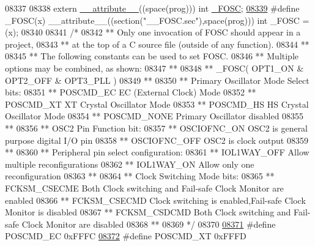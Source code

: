 \begin{DoxyCode}
{{{{08337 
08338 \textcolor{keyword}{extern} \hyperlink{a00009_a493c46f03454991ccc5aa7a6e1dfb2a7}{\_\_attribute\_\_}((space(prog))) int \hyperlink{a00009_a3b72a7757ab208ee35d0398426a4bca0}{\_FOSC};
\hypertarget{a00009_source_l08339}{}\hyperlink{a00009_a3b72a7757ab208ee35d0398426a4bca0}{08339} \textcolor{preprocessor}{#define \_FOSC(x) \_\_attribute\_\_((section("\_\_FOSC.sec"),space(prog))) int \_FOSC = (x);}
08340 
08341 \textcolor{comment}{/*}
08342 \textcolor{comment}{** Only one invocation of FOSC should appear in a project,}
08343 \textcolor{comment}{** at the top of a C source file (outside of any function).}
08344 \textcolor{comment}{**}
08345 \textcolor{comment}{** The following constants can be used to set FOSC.}
08346 \textcolor{comment}{** Multiple options may be combined, as shown:}
08347 \textcolor{comment}{**}
08348 \textcolor{comment}{** \_FOSC( OPT1\_ON & OPT2\_OFF & OPT3\_PLL )}
08349 \textcolor{comment}{**}
08350 \textcolor{comment}{**   Primary Oscillator Mode Select bits:}
08351 \textcolor{comment}{**     POSCMD\_EC            EC (External Clock) Mode}
08352 \textcolor{comment}{**     POSCMD\_XT            XT Crystal Oscillator Mode}
08353 \textcolor{comment}{**     POSCMD\_HS            HS Crystal Oscillator Mode}
08354 \textcolor{comment}{**     POSCMD\_NONE          Primary Oscillator disabled}
08355 \textcolor{comment}{**}
08356 \textcolor{comment}{**   OSC2 Pin Function bit:}
08357 \textcolor{comment}{**     OSCIOFNC\_ON          OSC2 is general purpose digital I/O pin}
08358 \textcolor{comment}{**     OSCIOFNC\_OFF         OSC2 is clock output}
08359 \textcolor{comment}{**}
08360 \textcolor{comment}{**   Peripheral pin select configuration:}
08361 \textcolor{comment}{**     IOL1WAY\_OFF          Allow multiple reconfigurations}
08362 \textcolor{comment}{**     IOL1WAY\_ON           Allow only one reconfiguration}
08363 \textcolor{comment}{**}
08364 \textcolor{comment}{**   Clock Switching Mode bits:}
08365 \textcolor{comment}{**     FCKSM\_CSECME         Both Clock switching and Fail-safe Clock Monitor are enabled}
08366 \textcolor{comment}{**     FCKSM\_CSECMD         Clock switching is enabled,Fail-safe Clock Monitor is disabled}
08367 \textcolor{comment}{**     FCKSM\_CSDCMD         Both Clock switching and Fail-safe Clock Monitor are disabled}
08368 \textcolor{comment}{**}
08369 \textcolor{comment}{*/}
08370 
\hypertarget{a00009_source_l08371}{}\hyperlink{a00009_a289cbd35334c9f85bd0b549a42a75b07}{08371} \textcolor{preprocessor}{#define POSCMD\_EC            0xFFFC}
\hypertarget{a00009_source_l08372}{}\hyperlink{a00009_a23bff3343c864819710aad75a8b03f8c}{08372} \textcolor{preprocessor}{#define POSCMD\_XT            0xFFFD}
}}}}
\end{DoxyCode}
